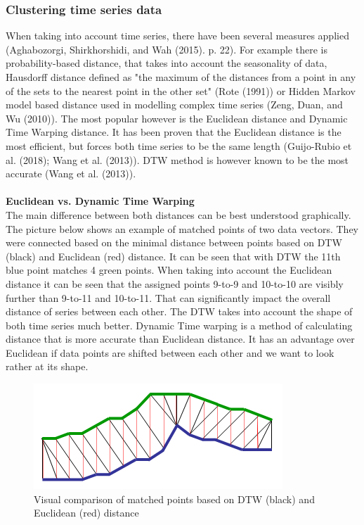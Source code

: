 \documentclass[11pt,a4paper]{article}
\begin{document}
\subsubsection{Clustering time series data}
When taking into account time series, there have been several measures applied
(Aghabozorgi, Shirkhorshidi, and Wah (2015). p. 22). For example there is
probability-based distance, that takes into account the seasonality of data,
Hausdorff distance defined as "the maximum of the distances from a point in any
of the sets to the nearest point in the other set" (Rote (1991)) or Hidden
Markov model based distance used in modelling complex time series (Zeng, Duan,
and Wu (2010)). The most popular however is the Euclidean distance and Dynamic
Time Warping distance. It has been proven that the Euclidean distance is the
most efficient, but forces both time series to be the same length (Guijo-Rubio
et al. (2018); Wang et al. (2013)). DTW method is however known to be the most
accurate (Wang et al. (2013)).\\
\\
\textbf{Euclidean vs. Dynamic Time Warping}\\
The main difference between both distances can be best understood graphically.
The picture below shows an example of matched points of two data vectors. They
were connected based on the minimal distance between points based on DTW (black)
and Euclidean (red) distance. It can be seen that with DTW the 11th blue point
matches 4 green points. When taking into account the Euclidean distance it can
be seen that the assigned points 9-to-9 and 10-to-10 are visibly further than
9-to-11 and 10-to-11. That can significantly impact the overall distance of
series between each other. The DTW takes into account the shape of both time
series much better. Dynamic Time warping is a method of calculating distance
that is more accurate than Euclidean distance. It has an advantage over
Euclidean if data points are shifted between each other and we want to look
rather at its shape.
\begin{figure}[H]
    \begin{center}
        \hspace*{-0.3cm}
        \includegraphics[scale=1.1]{img/euclidean-dtw.png}
    \end{center}
    \caption{Visual comparison of matched points based on DTW (black) and Euclidean (red) distance}
\end{figure}
\end{document}
